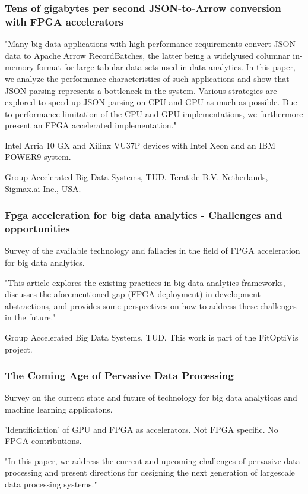 \subsubsection{Tens of gigabytes per second JSON-to-Arrow conversion with FPGA accelerators}
\cite{Peltenburg2021TensAccelerators}
"Many big data
applications with high performance requirements convert JSON
data to Apache Arrow RecordBatches, the latter being a widelyused
columnar in-memory format for large tabular data sets
used in data analytics. In this paper, we analyze the performance
characteristics of such applications and show that JSON parsing
represents a bottleneck in the system. Various strategies are
explored to speed up JSON parsing on CPU and GPU as much
as possible. Due to performance limitation of the CPU and GPU
implementations, we furthermore present an FPGA accelerated
implementation."

Intel Arria 10 GX and Xilinx VU37P
devices with Intel Xeon and an IBM POWER9 system.

Group Accelerated Big Data Systems, TUD. Teratide B.V. Netherlands, Sigmax.ai Inc., USA.

\subsubsection{Fpga acceleration for big data analytics - Challenges and opportunities}
\cite{Hoozemans2021FPGAOpportunities}
Survey of the available technology and fallacies in the field of FPGA acceleration for big data analytics.

"This article explores the existing practices in big data analytics
frameworks, discusses the aforementioned gap (FPGA deployment) in development
abstractions, and provides some perspectives on how to address
these challenges in the future."

Group Accelerated Big Data Systems, TUD.
This work is part of the FitOptiVis project.

\subsubsection{The Coming Age of Pervasive Data Processing}
\cite{Rellermeyer2019TheProcessing}
Survey on the current state and future of technology for big data analyticas and machine learning applicatons.

'Identificiation' of GPU and FPGA as accelerators. Not FPGA specific. No FPGA contributions.

"In this paper, we address
the current and upcoming challenges of pervasive data processing
and present directions for designing the next generation of largescale
data processing systems."

